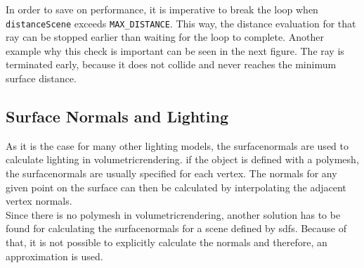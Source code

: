\noindent
In order to save on performance, it is imperative to break the loop when \lstinline[language=HLSL]{distanceScene} exceeds \lstinline[language=HLSL]{MAX_DISTANCE}. This way, the distance evaluation for that ray can be stopped earlier than waiting for the loop to complete.
Another example why this check is important can be seen in the next figure. The ray is terminated early, because it does not collide and never reaches the minimum surface distance.
\begin{figure}[H]
    \centering
\end{figure}

\clearpage
\subsection{Surface Normals and Lighting}
As it is the case for many other lighting models, the \gls{surfacenormal}s are used to calculate lighting in \gls{volumetricrendering}. 
if the object is defined with a \gls{polymesh}, the \gls{surfacenormal}s are usually specified for each vertex. The normals for any given point on the surface can then be calculated by interpolating the adjacent vertex normals. 
\\
Since there is no \gls{polymesh} in \gls{volumetricrendering}, another solution has to be found for calculating the \gls{surfacenormal}s for a scene defined by \gls{sdf}s.
Because of that, it is not possible to explicitly calculate the normals and therefore, an approximation is used. 

